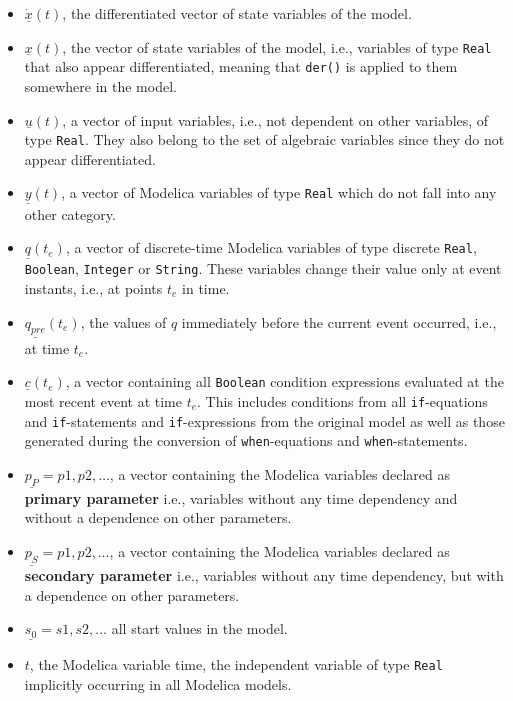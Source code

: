 \begin{itemize}
\item $\underline{\dot x}(t)$, the differentiated vector of state variables of
the model.
\item $\underline{x}(t)$, the vector of state variables of the model, i.e.,
variables of type \verb+Real+ that also appear differentiated, meaning that \verb+der()+ is
applied to them somewhere in the model.
\item $\underline{u}(t)$, a vector of input variables, i.e., not dependent on
other variables, of type \verb+Real+. They also belong to the set of algebraic
variables since they do not appear differentiated.
\item $\underline{y}(t)$, a vector of Modelica variables of type \verb+Real+
which do not fall into any other category. 
\item $\underline{q}(t_e)$, a vector of discrete-time Modelica variables of type
discrete \verb+Real+, \verb+Boolean+, \verb+Integer+ or \verb+String+. These variables
change their value only at event instants, i.e., at points $t_e$ in time.
\item $\underline{q_{pre}}(t_e)$, the values of $q$ immediately before the
current event occurred, i.e., at time $t_e$.
\item $\underline{c}(t_e)$, a vector containing all \verb+Boolean+ condition
expressions evaluated at the most recent event at time $t_e$. This includes conditions from
all \verb+if+-equations and \verb+if+-statements and \verb+if+-expressions from
the original model as well as those generated during the conversion of \verb+when+-equations
and \verb+when+-statements.
\item $\underline{p_{P}} = {p1, p2, \ldots}$, a vector containing the Modelica
variables declared as \textbf{primary parameter} i.e., variables without any
time dependency and without a dependence on other parameters.
\item $\underline{p_{S}} = {p1, p2, \ldots}$, a vector containing the Modelica
variables declared as \textbf{secondary parameter} i.e., variables without any
time dependency, but with a dependence on other parameters.
\item $\underline{s_0} = {s1, s2, \ldots}$ all start values in the model.
\item $t$, the Modelica variable time, the independent variable of type
\verb+Real+ implicitly occurring in all Modelica models.
\end{itemize}

